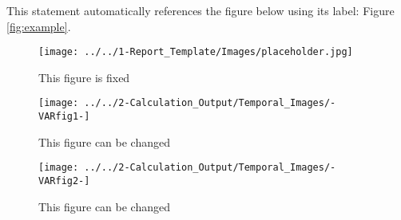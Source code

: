 \documentclass[12pt,a4paper]{article} %
\begin{document}
This statement automatically references the figure below using its label: Figure \ref{fig:example}.

\begin{figure}[h]
    \centering
    \texttt{[image: ../../1-Report\_Template/Images/placeholder.jpg]}
   \caption{This figure is fixed}
\end{figure}



\begin{figure}[h]
    \centering
    \texttt{[image: ../../2-Calculation\_Output/Temporal\_Images/-VARfig1-]}
    \caption{This figure can be changed}
\end{figure}

\begin{figure}[h]
    \centering
    \texttt{[image: ../../2-Calculation\_Output/Temporal\_Images/-VARfig2-]}
    \caption{This figure can be changed}
\end{figure}





\end{document}
